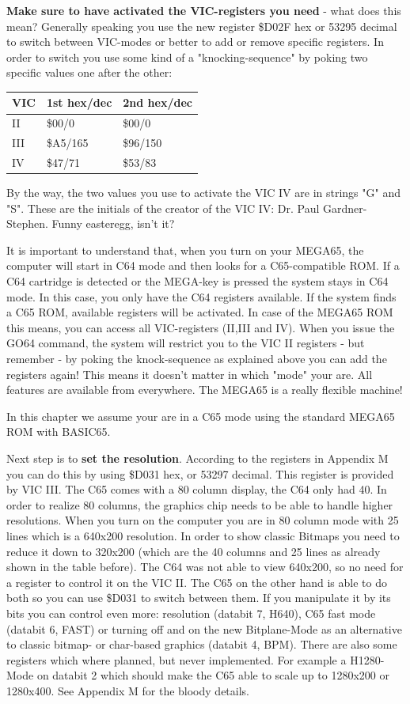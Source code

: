 \textbf{Make sure to have activated the VIC-registers you need} - what does this mean? Generally speaking you use the new register \$D02F hex or 53295 decimal to switch between VIC-modes or better to add or remove specific registers. In order to switch you use some kind of a "knocking-sequence" by poking two specific values one after the other: 

\begin{tabular}{|l|l|l|}
	\hline
	VIC & 1st hex/dec & 2nd hex/dec \\
	\hline
	II  & \$00/0 & \$00/0\\
	III & \$A5/165 & \$96/150\\
	IV  & \$47/71 & \$53/83\\	
	\hline
\end{tabular}

By the way, the two values you use to activate the VIC IV are in strings "G" and "S". These are the initials of the creator of the VIC IV: Dr. Paul Gardner-Stephen. Funny easteregg, isn't it? 

It is important to understand that, when you turn on your MEGA65, the computer will start in C64 mode and then looks for a C65-compatible ROM. If a C64 cartridge is detected or the MEGA-key is pressed the system stays in C64 mode. In this case, you only have the C64 registers available. If the system finds a C65 ROM, available registers will be activated. In case of the MEGA65 ROM this means, you can access all VIC-registers (II,III and IV). When you issue the GO64 command, the system will restrict you to the VIC II registers - but remember - by poking the knock-sequence as explained above you can add the registers again! This means it doesn't matter in which "mode" your are. All features are available from everywhere. The MEGA65 is a really flexible machine!


In this chapter we assume your are in a C65 mode using the standard MEGA65 ROM with BASIC65.


Next step is to \textbf{set the resolution}. According to the registers in Appendix M you can do this by using \$D031 hex, or 53297 decimal. This register is provided by VIC III. The C65 comes with a 80 column display, the C64 only had 40. In order to realize 80 columns, the graphics chip needs to be able to handle higher resolutions. When you turn on the computer you are in 80 column mode with 25 lines which is a 640x200 resolution. In order to show classic Bitmaps you need to reduce it down to 320x200 (which are the 40 columns and 25 lines as already shown in the table before). The C64 was not able to view 640x200, so no need for a register to control it on the VIC II. The C65 on the other hand is able to do both so you can use \$D031 to switch between them.  If you manipulate it by its bits you can control even more: resolution (databit 7, H640), C65 fast mode (databit 6, FAST) or turning off and on the new Bitplane-Mode as an alternative to classic bitmap- or char-based graphics (databit 4, BPM). There are also some registers which where planned, but never implemented. For example a H1280-Mode on databit 2 which should make the C65 able to scale up to 1280x200 or 1280x400. See Appendix M for the bloody details.

